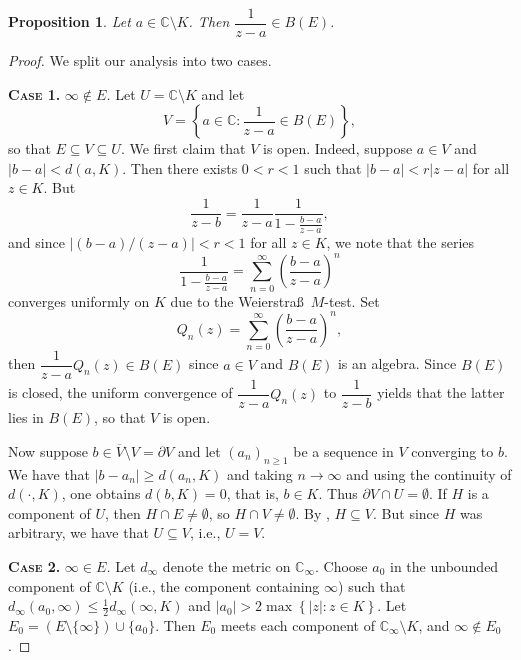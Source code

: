 \documentclass[11pt]{article}
\theoremstyle{thmstyle}
\newtheorem{proposition}[theorem]{Proposition}
\theoremstyle{defstyle}
\newcommand{\bbC}{\mathbb{C}}
\renewcommand{\le}{\leqslant}
\renewcommand{\ge}{\geqslant}
\begin{document}
\begin{proposition}
    Let $a\in\bbC\setminus K$. Then $\dfrac{1}{z - a}\in B(E)$.
\end{proposition}
\begin{proof}
    We split our analysis into two cases. 

    \noindent\textbf{\scshape Case 1.} \emph{$\infty\notin E$.} Let $U = \bbC\setminus K$ and let 
    \begin{equation*}
        V = \left\{a\in\bbC\colon\frac{1}{z - a}\in B(E)\right\},
    \end{equation*}
    so that $E\subseteq V\subseteq U$. We first claim that $V$ is open. Indeed, suppose $a\in V$ and $|b - a| < d(a, K)$. Then there exists $0 < r < 1$ such that $|b - a| < r |z - a|$ for all $z\in K$. But 
    \begin{equation*}
        \frac{1}{z - b} = \frac{1}{z - a}\frac{1}{1 - \frac{b - a}{z - a}},
    \end{equation*}
    and since $|(b - a)/(z - a)| < r < 1$ for all $z\in K$, we note that the series 
    \begin{equation*}
        \frac{1}{1 - \frac{b - a}{z - a}} = \sum_{n = 0}^\infty\left(\frac{b - a}{z - a}\right)^n
    \end{equation*}
    converges uniformly on $K$ due to the Weierstra\ss\ $M$-test. Set 
    \begin{equation*}
        Q_n(z) = \sum_{n = 0}^\infty\left(\frac{b - a}{z - a}\right)^n,
    \end{equation*}
    then $\dfrac{1}{z - a}Q_n(z)\in B(E)$ since $a\in V$ and $B(E)$ is an algebra. Since $B(E)$ is closed, the uniform convergence of $\dfrac{1}{z - a}Q_n(z)$ to $\dfrac{1}{z - b}$ yields that the latter lies in $B(E)$, so that $V$ is open.

    Now suppose $b\in\overline V\setminus V = \partial V$ and let $(a_n)_{n\ge 1}$ be a sequence in $V$ converging to $b$. We have that $|b - a_n|\ge d(a_n, K)$ and taking $n\to\infty$ and using the continuity of $d(\cdot, K)$, one obtains $d(b, K) = 0$, that is, $b\in K$. Thus $\partial V\cap U = \emptyset$. If $H$ is a component of $U$, then $H\cap E\ne\emptyset$, so $H\cap V\ne\emptyset$. By , $H\subseteq V$. But since $H$ was arbitrary, we have that $U\subseteq V$, i.e., $U = V$.

    \noindent\textbf{\scshape Case 2.} \emph{$\infty\in E$.} Let $d_\infty$ denote the metric on $\bbC_\infty$. Choose $a_0$ in the unbounded component of $\bbC\setminus K$ (i.e., the component containing $\infty$) such that $d_\infty(a_0, \infty)\le\frac{1}{2}d_\infty(\infty, K)$ and $|a_0| > 2\max\left\{|z|\colon z\in K\right\}$. Let $E_0 = (E\setminus\{\infty\})\cup\{a_0\}$. Then $E_0$ meets each component of $\bbC_\infty\setminus K$, and $\infty\notin E_0$. 


\end{proof}
\end{document}
